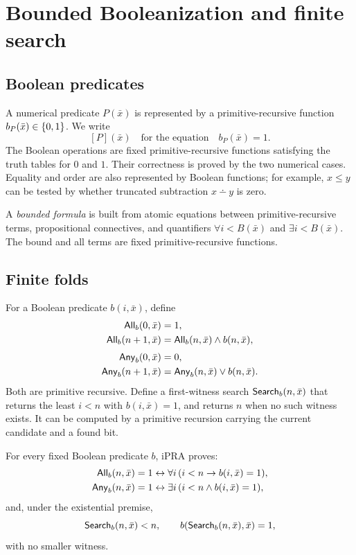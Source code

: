 \section{Bounded Booleanization and finite search}
\label{sec:booleanization}

\subsection{Boolean predicates}

A numerical predicate \(P(\bar x)\) is represented by a primitive-recursive
function \(b_P(\bar x)\in\{0,1\}\).  We write
\[
  [P](\bar x) \quad\text{for the equation}\quad b_P(\bar x)=1.
\]
The Boolean operations are fixed primitive-recursive functions satisfying the
truth tables for \(0\) and \(1\).  Their correctness is proved by the two
numerical cases.  Equality and order are also represented by Boolean functions;
for example, \(x\le y\) can be tested by whether truncated subtraction
\(x\dotminus y\) is zero.

A \emph{bounded formula} is built from atomic equations between
primitive-recursive terms, propositional connectives, and quantifiers
\(\forall i<B(\bar x)\) and \(\exists i<B(\bar x)\).  The bound and all terms
are fixed primitive-recursive functions.

\subsection{Finite folds}

For a Boolean predicate \(b(i,\bar x)\), define
\begin{align*}
 \mathsf{All}_b(0,\bar x)&=1,\\
 \mathsf{All}_b(n+1,\bar x)&=\mathsf{All}_b(n,\bar x)\wedge b(n,\bar x),\\[3pt]
 \mathsf{Any}_b(0,\bar x)&=0,\\
 \mathsf{Any}_b(n+1,\bar x)&=\mathsf{Any}_b(n,\bar x)\vee b(n,\bar x).
\end{align*}
Both are primitive recursive.  Define a first-witness search
\(\mathsf{Search}_b(n,\bar x)\) that returns the least \(i<n\) with
\(b(i,\bar x)=1\), and returns \(n\) when no such witness exists.  It can be
computed by a primitive recursion carrying the current candidate and a found
bit.

\begin{theorem}
\label{thm:boolean-fold}
For every fixed Boolean predicate \(b\), iPRA proves:
\begin{align*}
 \mathsf{All}_b(n,\bar x)=1
  &\leftrightarrow \forall i\,(i<n\to b(i,\bar x)=1),\\
 \mathsf{Any}_b(n,\bar x)=1
  &\leftrightarrow \exists i\,(i<n\wedge b(i,\bar x)=1),
\end{align*}
and, under the existential premise,
\[
 \mathsf{Search}_b(n,\bar x)<n,
 \qquad b(\mathsf{Search}_b(n,\bar x),\bar x)=1,
\]
with no smaller witness.
\end{theorem}

